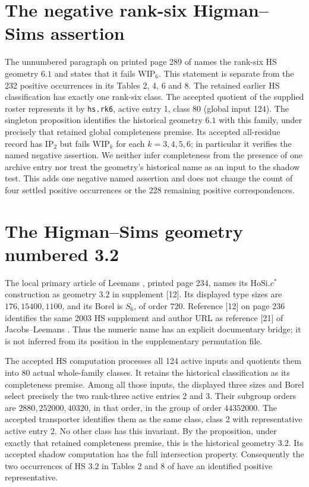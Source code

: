 \documentclass[11pt,a4paper]{article}
\begin{document}
\section{The negative rank-six Higman--Sims assertion}
The unnumbered paragraph on printed page 289 of \cite{JL} names the
rank-six HS geometry $6.1$ and states that it fails $\mathrm{WIP}_6$.
This statement is separate from the 232 positive occurrences in its
Tables 2, 4, 6 and 8. The retained earlier HS classification has exactly
one rank-six class. The accepted quotient of the supplied roster represents
it by \texttt{hs.rk6}, active entry 1, class 80 (global input 124).
The singleton proposition identifies the historical geometry $6.1$ with
this family, under precisely that retained global completeness premise.
Its accepted all-residue record has $\mathrm{IP}_2$ but fails
$\mathrm{WIP}_k$ for each $k=3,4,5,6$; in particular it verifies the named
negative assertion. We neither infer completeness from the presence of
one archive entry nor treat the geometry's historical name as an input to
the shadow test. This adds one negative named assertion and does not
change the count of four settled positive occurrences or the 228
remaining positive correspondences.

\section{The Higman--Sims geometry numbered 3.2}
The local primary article of Leemans \cite{HS}, printed page 234, names
its $\mathrm{HoSi}.c^*$ construction as geometry $3.2$ in supplement [12].
Its displayed type sizes are $176,15400,1100$, and its Borel is $S_6$,
of order $720$. Reference [12] on page 236 identifies the same 2003 HS
supplement and author URL as reference [21] of Jacobs--Leemans
\cite{JL}. Thus the numeric name has an explicit documentary bridge;
it is not inferred from its position in the supplementary permutation
file.

The accepted HS computation processes all 124 active inputs and
quotients them into 80 actual whole-family classes. It retains the
historical classification as its completeness premise. Among all those
inputs, the displayed three sizes and Borel select precisely the two
rank-three active entries 2 and 3. Their subgroup orders are
$2880,252000,40320$, in that order, in the group of order $44352000$.
The accepted transporter identifies them as the same class, class 2
with representative active entry 2. No other class has this invariant.
By the proposition, under exactly that retained completeness premise,
this is the historical geometry $3.2$. Its accepted shadow computation
has the full intersection property. Consequently the two occurrences
of HS $3.2$ in Tables 2 and 8 of \cite{JL} have an identified positive
representative.
\end{document}
